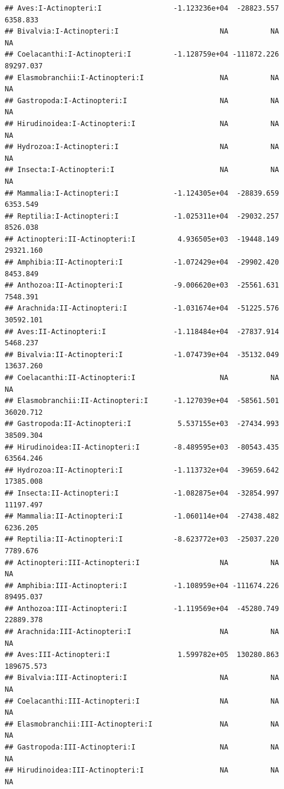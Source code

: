 \documentclass[
  12pt,
]{article}
\begin{document}
\begin{verbatim}
## Aves:I-Actinopteri:I                 -1.123236e+04  -28823.557    6358.833
## Bivalvia:I-Actinopteri:I                        NA          NA          NA
## Coelacanthi:I-Actinopteri:I          -1.128759e+04 -111872.226   89297.037
## Elasmobranchii:I-Actinopteri:I                  NA          NA          NA
## Gastropoda:I-Actinopteri:I                      NA          NA          NA
## Hirudinoidea:I-Actinopteri:I                    NA          NA          NA
## Hydrozoa:I-Actinopteri:I                        NA          NA          NA
## Insecta:I-Actinopteri:I                         NA          NA          NA
## Mammalia:I-Actinopteri:I             -1.124305e+04  -28839.659    6353.549
## Reptilia:I-Actinopteri:I             -1.025311e+04  -29032.257    8526.038
## Actinopteri:II-Actinopteri:I          4.936505e+03  -19448.149   29321.160
## Amphibia:II-Actinopteri:I            -1.072429e+04  -29902.420    8453.849
## Anthozoa:II-Actinopteri:I            -9.006620e+03  -25561.631    7548.391
## Arachnida:II-Actinopteri:I           -1.031674e+04  -51225.576   30592.101
## Aves:II-Actinopteri:I                -1.118484e+04  -27837.914    5468.237
## Bivalvia:II-Actinopteri:I            -1.074739e+04  -35132.049   13637.260
## Coelacanthi:II-Actinopteri:I                    NA          NA          NA
## Elasmobranchii:II-Actinopteri:I      -1.127039e+04  -58561.501   36020.712
## Gastropoda:II-Actinopteri:I           5.537155e+03  -27434.993   38509.304
## Hirudinoidea:II-Actinopteri:I        -8.489595e+03  -80543.435   63564.246
## Hydrozoa:II-Actinopteri:I            -1.113732e+04  -39659.642   17385.008
## Insecta:II-Actinopteri:I             -1.082875e+04  -32854.997   11197.497
## Mammalia:II-Actinopteri:I            -1.060114e+04  -27438.482    6236.205
## Reptilia:II-Actinopteri:I            -8.623772e+03  -25037.220    7789.676
## Actinopteri:III-Actinopteri:I                   NA          NA          NA
## Amphibia:III-Actinopteri:I           -1.108959e+04 -111674.226   89495.037
## Anthozoa:III-Actinopteri:I           -1.119569e+04  -45280.749   22889.378
## Arachnida:III-Actinopteri:I                     NA          NA          NA
## Aves:III-Actinopteri:I                1.599782e+05  130280.863  189675.573
## Bivalvia:III-Actinopteri:I                      NA          NA          NA
## Coelacanthi:III-Actinopteri:I                   NA          NA          NA
## Elasmobranchii:III-Actinopteri:I                NA          NA          NA
## Gastropoda:III-Actinopteri:I                    NA          NA          NA
## Hirudinoidea:III-Actinopteri:I                  NA          NA          NA

\end{verbatim}
\end{document}
